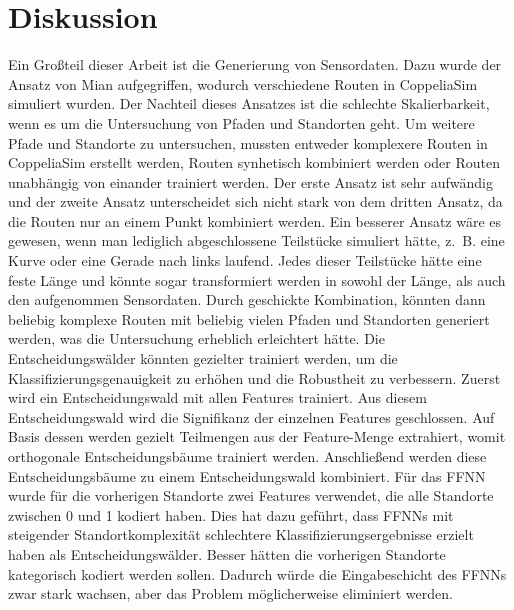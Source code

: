 \chapter{Diskussion}
\label{chapter:discussion}
Ein Großteil dieser Arbeit ist die Generierung von Sensordaten.
Dazu wurde der Ansatz von Mian aufgegriffen, wodurch verschiedene Routen in CoppeliaSim simuliert wurden.
Der Nachteil dieses Ansatzes ist die schlechte Skalierbarkeit, wenn es um die Untersuchung von Pfaden und Standorten geht.
Um weitere Pfade und Standorte zu untersuchen, mussten entweder komplexere Routen in CoppeliaSim erstellt werden,
Routen synhetisch kombiniert werden oder Routen unabhängig von einander trainiert werden.
\newline
\newline
Der erste Ansatz ist sehr aufwändig und der zweite Ansatz unterscheidet sich nicht stark von dem dritten Ansatz,
da die Routen nur an einem Punkt kombiniert werden.
Ein besserer Ansatz wäre es gewesen, wenn man lediglich abgeschlossene Teilstücke simuliert hätte,
z.~B. eine Kurve oder eine Gerade nach links laufend.
Jedes dieser Teilstücke hätte eine feste Länge und könnte sogar transformiert werden in sowohl der Länge, als auch den aufgenommen Sensordaten.
Durch geschickte Kombination, könnten dann beliebig komplexe Routen mit beliebig vielen Pfaden und Standorten generiert werden,
was die Untersuchung erheblich erleichtert hätte.
\newline
\newline
Die Entscheidungswälder könnten gezielter trainiert werden, um die Klassifizierungsgenauigkeit zu erhöhen und die Robustheit zu verbessern.
Zuerst wird ein Entscheidungswald mit allen Features trainiert.
Aus diesem Entscheidungswald wird die Signifikanz der einzelnen Features geschlossen.
Auf Basis dessen werden gezielt Teilmengen aus der Feature-Menge extrahiert, womit orthogonale Entscheidungsbäume trainiert werden.
Anschließend werden diese Entscheidungsbäume zu einem Entscheidungswald kombiniert.
\newpage
Für das FFNN wurde für die vorherigen Standorte zwei Features verwendet, die alle Standorte zwischen 0 und 1 kodiert haben.
Dies hat dazu geführt, dass FFNNs mit steigender Standortkomplexität schlechtere Klassifizierungsergebnisse erzielt haben als Entscheidungswälder.
Besser hätten die vorherigen Standorte kategorisch kodiert werden sollen.
Dadurch würde die Eingabeschicht des FFNNs zwar stark wachsen, aber das Problem möglicherweise eliminiert werden.
\newline
\newline
